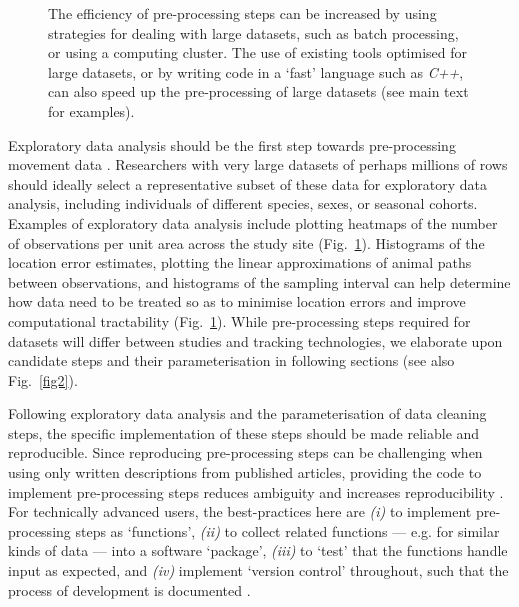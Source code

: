 \begin{refsection}[sorting=nyt]
\begin{figure}
{{            The efficiency of pre-processing steps can be increased by using strategies for dealing with large datasets, such as batch processing, or using a computing cluster.
            The use of existing tools optimised for large datasets, or by writing code in a `fast' language such as \textit{C++}, can also speed up the pre-processing of large datasets (see main text for examples).
        }
        }
        \label{fig1}
    \end{figure}

    Exploratory data analysis should be the first step towards pre-processing movement data \citep[see Fig.~\ref{fig1};][]{slingsby2016}.
    Researchers with very large datasets of perhaps millions of rows should ideally select a representative subset of these data for exploratory data analysis, including individuals of different species, sexes, or seasonal cohorts.
    Examples of exploratory data analysis include plotting heatmaps of the number of observations per unit area across the study site (Fig.~\ref{fig1}).
    Histograms of the location error estimates, plotting the linear approximations of animal paths between observations, and histograms of the sampling interval can help determine how data need to be treated so as to minimise location errors and improve computational tractability (Fig.~\ref{fig1}).
    While pre-processing steps required for datasets will differ between studies and tracking technologies, we elaborate upon candidate steps and their parameterisation in following sections (see also Fig.~\ref{fig2}).

    Following exploratory data analysis and the parameterisation of data cleaning steps, the specific implementation of these steps should be made reliable and reproducible.
    Since reproducing pre-processing steps can be challenging when using only written descriptions from published articles, providing the code to implement pre-processing steps reduces ambiguity and increases reproducibility \citep{haddaway2015}.
    For technically advanced users, the best-practices here are \textit{(i)} to implement pre-processing steps as `functions', \textit{(ii)} to collect related functions --- e.g. for similar kinds of data --- into a software `package', \textit{(iii)} to `test' that the functions handle input as expected, and \textit{(iv)} implement `version control' throughout, such that the process of development is documented \citep[Fig.~\ref{fig1};][]{wickham2015,alston2020,perez-riverol2016}.


\end{refsection}
